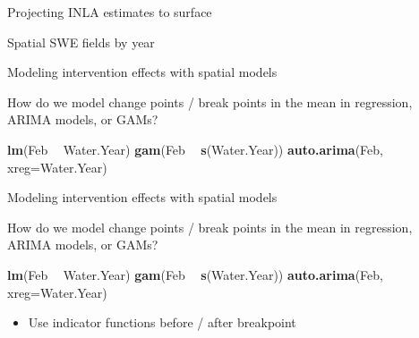 \documentclass[ignorenonframetext,]{beamer}
\newenvironment{Shaded}{\begin{snugshade}}{\end{snugshade}}
\newcommand{\DataTypeTok}[1]{\textcolor[rgb]{0.13,0.29,0.53}{#1}}
\newcommand{\KeywordTok}[1]{\textcolor[rgb]{0.13,0.29,0.53}{\textbf{#1}}}
\newcommand{\NormalTok}[1]{#1}
\newcommand{\OperatorTok}[1]{\textcolor[rgb]{0.81,0.36,0.00}{\textbf{#1}}}
\newcommand{\StringTok}[1]{\textcolor[rgb]{0.31,0.60,0.02}{#1}}
\providecommand{\tightlist}{%
  \setlength{\itemsep}{0pt}\setlength{\parskip}{0pt}}
\begin{document}
\begin{frame}{Projecting INLA estimates to surface}
\protect\hypertarget{projecting-inla-estimates-to-surface}{}

\end{frame}

\begin{frame}{Spatial SWE fields by year}
\protect\hypertarget{spatial-swe-fields-by-year}{}

\end{frame}

\begin{frame}[fragile]{Modeling intervention effects with spatial
models}
\protect\hypertarget{modeling-intervention-effects-with-spatial-models}{}

How do we model change points / break points in the mean in regression,
ARIMA models, or GAMs?

\begin{Shaded}
\begin{Highlighting}[]
\KeywordTok{lm}\NormalTok{(Feb }\OperatorTok{~}\StringTok{ }\NormalTok{Water.Year)}
\KeywordTok{gam}\NormalTok{(Feb }\OperatorTok{~}\StringTok{ }\KeywordTok{s}\NormalTok{(Water.Year))}
\KeywordTok{auto.arima}\NormalTok{(Feb, }\DataTypeTok{xreg=}\NormalTok{Water.Year)}
\end{Highlighting}
\end{Shaded}

\end{frame}

\begin{frame}[fragile]{Modeling intervention effects with spatial
models}
\protect\hypertarget{modeling-intervention-effects-with-spatial-models-1}{}

How do we model change points / break points in the mean in regression,
ARIMA models, or GAMs?

\begin{Shaded}
\begin{Highlighting}[]
\KeywordTok{lm}\NormalTok{(Feb }\OperatorTok{~}\StringTok{ }\NormalTok{Water.Year)}
\KeywordTok{gam}\NormalTok{(Feb }\OperatorTok{~}\StringTok{ }\KeywordTok{s}\NormalTok{(Water.Year))}
\KeywordTok{auto.arima}\NormalTok{(Feb, }\DataTypeTok{xreg=}\NormalTok{Water.Year)}
\end{Highlighting}
\end{Shaded}

\begin{itemize}
\tightlist
\item
  Use indicator functions before / after breakpoint
\end{itemize}

\end{frame}
\end{document}
